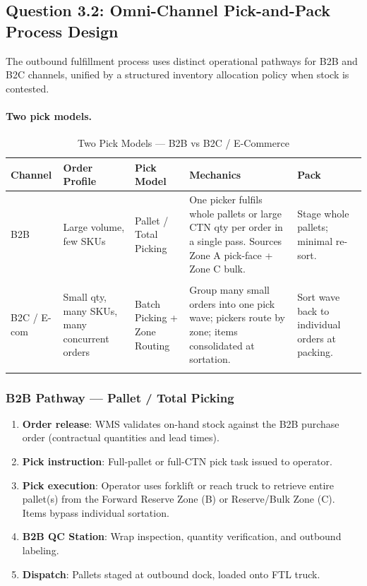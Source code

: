 \documentclass[11pt]{article}
\begin{document}
\subsection{Question 3.2: Omni-Channel Pick-and-Pack Process Design}\label{q3.2}

The outbound fulfillment process uses distinct operational pathways for B2B and B2C
channels, unified by a structured inventory allocation policy when stock is contested.

\paragraph{Two pick models.}

\begin{table}[H]
\centering
\caption{Two Pick Models --- B2B vs B2C / E-Commerce}
\begin{tabular}{>{\raggedright\arraybackslash}p{1.8cm} >{\raggedright\arraybackslash}p{3.2cm} >{\raggedright\arraybackslash}p{3.2cm} >{\raggedright\arraybackslash}p{4.8cm} >{\raggedright\arraybackslash}p{2.8cm}}
\toprule
Channel & Order Profile & Pick Model & Mechanics & Pack \\
\midrule
        B2B & Large volume, few SKUs & Pallet / Total Picking & One picker fulfils whole pallets or large CTN qty per order in a single pass. Sources Zone A pick-face + Zone C bulk. & Stage whole pallets; minimal re-sort. \\\\
        \addlinespace
        B2C / E-com & Small qty, many SKUs, many concurrent orders & Batch Picking + Zone Routing & Group many small orders into one pick wave; pickers route by zone; items consolidated at sortation. & Sort wave back to individual orders at packing. \\\\
\bottomrule
\end{tabular}
\end{table}

\subsubsection{B2B Pathway — Pallet / Total Picking}\label{b2b-path}
\begin{enumerate}
    \item \textbf{Order release}: WMS validates on-hand stock against the B2B
          purchase order (contractual quantities and lead times).
    \item \textbf{Pick instruction}: Full-pallet or full-CTN pick task issued to operator.
    \item \textbf{Pick execution}: Operator uses forklift or reach truck to retrieve
          entire pallet(s) from the Forward Reserve Zone (B) or Reserve/Bulk Zone (C).
          Items bypass individual sortation.
    \item \textbf{B2B QC Station}: Wrap inspection, quantity verification, and
          outbound labeling.
    \item \textbf{Dispatch}: Pallets staged at outbound dock, loaded onto FTL truck.
\end{enumerate}
\end{document}
